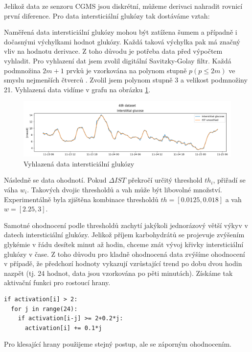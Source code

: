 
Jelikož data ze senzoru CGMS jsou diskrétní, můžeme derivaci nahradit rovnicí první diference. Pro data intersticiální glukózy tak dostáváme vztah:


Naměřená data intersticiální glukózy mohou být zatížena šumem a případně i dočasnými výchylkami hodnot glukózy. Každá taková výchylka pak má značný vliv na hodnotu derivace. Z toho důvodu je potřeba data před výpočtem vyhladit. Pro vyhlazení dat jsem zvolil digitální Savitzky-Golay filtr. Každá podmnožina $2m+1$ prvků je vzorkována na polynom stupně $p (p\leq 2m)$ ve smyslu nejmenších čtverců \citep{cho.savgol}. Zvolil jsem polynom stupně 3 a velikost podmnožiny 21. Vyhlazená data vidíme v grafu na obrázku \ref{fig:savgol}.

\begin{figure}[H]
\caption{Vyhlazená data intersticiální glukózy}
\label{fig:savgol}
\centering
\includegraphics[width=1\textwidth]{img/cho/savgol.png}
\end{figure}

Následně se data ohodnotí. Pokud $\Delta IST$ překročí určitý threshold $th_{i}$, přiřadí se váha $w_{i}$. Takových dvojic thresholdů a vah může být libovolné množství. Experimentálně byla zjištěna kombinace thresholdů $th=[0.0125, 0.018]$ a vah $w=[2.25, 3]$.

Samotné ohodnocení podle thresholdů zachytí jakýkoli jednorázový větší výkyv v datech intersticiální glukózy. Jelikož příjem karbohydrátů se projevuje zvýšením glykémie v řádu desítek minut až hodin, chceme znát vývoj křivky intersticiální glukózy v čase. Z toho důvodu pro kladně ohodnocená data zvýšíme ohodnocení v případě, že předchozí hodnoty vykazují vzrůstající trend po dobu dvou hodin nazpět (tj. 24 hodnot, data jsou vzorkována po pěti minutách). Získáme tak aktivační funkci pro rostoucí hrany.
\begin{verbatim}
if activation[i] > 2:
  for j in range(24):
    if activation[i-j] >= 2+0.2*j:
      activation[i] += 0.1*j
\end{verbatim}
Pro klesající hrany použijeme stejný postup, ale se záporným ohodnocením.

